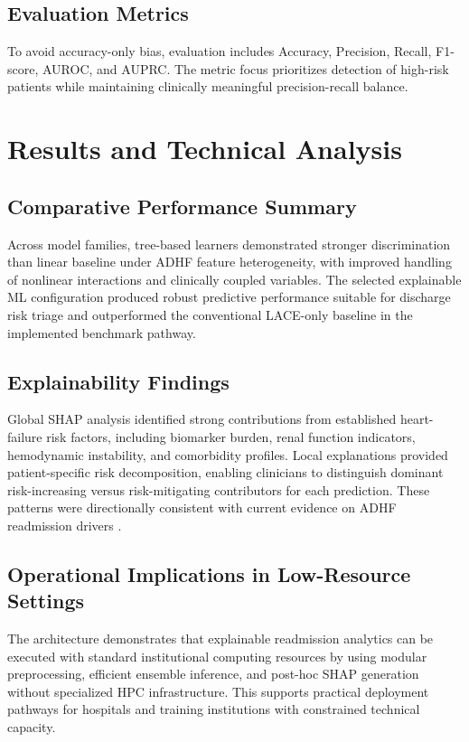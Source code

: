 \documentclass[conference]{IEEEtran}
\begin{document}
\subsection{Evaluation Metrics}
To avoid accuracy-only bias, evaluation includes Accuracy, Precision, Recall, F1-score, AUROC, and AUPRC. The metric focus prioritizes detection of high-risk patients while maintaining clinically meaningful precision-recall balance.

\section{Results and Technical Analysis}
\subsection{Comparative Performance Summary}
Across model families, tree-based learners demonstrated stronger discrimination than linear baseline under ADHF feature heterogeneity, with improved handling of nonlinear interactions and clinically coupled variables. The selected explainable ML configuration produced robust predictive performance suitable for discharge risk triage and outperformed the conventional LACE-only baseline in the implemented benchmark pathway.

\subsection{Explainability Findings}
Global SHAP analysis identified strong contributions from established heart-failure risk factors, including biomarker burden, renal function indicators, hemodynamic instability, and comorbidity profiles. Local explanations provided patient-specific risk decomposition, enabling clinicians to distinguish dominant risk-increasing versus risk-mitigating contributors for each prediction. These patterns were directionally consistent with current evidence on ADHF readmission drivers \cite{ref05_zhang_2024,ref08_luo_2024,ref18_zang_2026}.

\subsection{Operational Implications in Low-Resource Settings}
The architecture demonstrates that explainable readmission analytics can be executed with standard institutional computing resources by using modular preprocessing, efficient ensemble inference, and post-hoc SHAP generation without specialized HPC infrastructure. This supports practical deployment pathways for hospitals and training institutions with constrained technical capacity.
\end{document}
